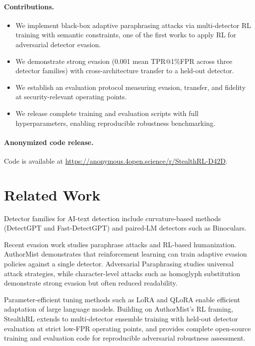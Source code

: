 \documentclass{article} %
\begin{document}
\paragraph{Contributions.}
\begin{itemize}
  \item We implement black-box adaptive paraphrasing attacks via multi-detector RL training with semantic constraints, one of the first works to apply RL for adversarial detector evasion.
  \item We demonstrate strong evasion (0.001 mean TPR@1\%FPR across three detector families) with cross-architecture transfer to a held-out detector.
  \item We establish an evaluation protocol measuring evasion, transfer, and fidelity at security-relevant operating points.
  \item We release complete training and evaluation scripts with full hyperparameters, enabling reproducible robustness benchmarking.
\end{itemize}

\paragraph{Anonymized code release.}
Code is available at \url{https://anonymous.4open.science/r/StealthRL-D42D}.
\section{Related Work}
Detector families for AI-text detection include curvature-based methods (DetectGPT and Fast-DetectGPT) and paired-LM detectors such as Binoculars. \cite{mitchell2023detectgptzeroshotmachinegeneratedtext,bao2024fastdetectgptefficientzeroshotdetection,hans2024spottingllmsbinocularszeroshot}

Recent evasion work studies paraphrase attacks and RL-based humanization. AuthorMist demonstrates that reinforcement learning can train adaptive evasion policies against a single detector. \cite{david2025authormistevadingaitext} Adversarial Paraphrasing studies universal attack strategies, while character-level attacks such as homoglyph substitution demonstrate strong evasion but often reduced readability. \cite{cheng2025adversarialparaphrasinguniversalattack,creo2025silverspeakevadingaigeneratedtext}

Parameter-efficient tuning methods such as LoRA and QLoRA enable efficient adaptation of large language models. \cite{hu2021loralowrankadaptationlarge,dettmers2023qlora} Building on AuthorMist's RL framing, StealthRL extends to multi-detector ensemble training with held-out detector evaluation at strict low-FPR operating points, and provides complete open-source training and evaluation code for reproducible adversarial robustness assessment.
\end{document}
